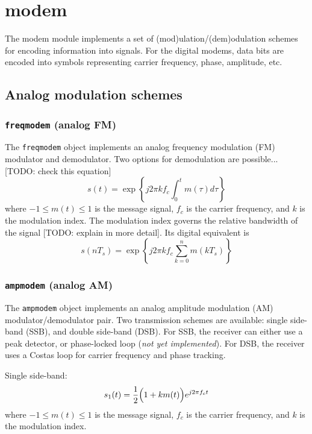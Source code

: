 % 
%

\section{modem}
\label{module:modem}
The modem module implements a set of (mod)ulation/(dem)odulation schemes
for encoding information into signals.
For the digital modems, data bits are encoded into symbols representing
carrier frequency, phase, amplitude, etc.

\subsection{Analog modulation schemes}
\subsubsection{{\tt freqmodem} (analog FM)}
The {\tt freqmodem} object implements an analog frequency modulation (FM)
modulator and demodulator.
Two options for demodulation are possible...
[TODO: check this equation]
\[
    s(t) =  \exp\left\{
                j 2 \pi k f_c
                \int_{0}^{t}{
                    m(\tau)d\tau
                }
            \right\}
\]
where $-1 \le m(t) \le 1$ is the message signal, $f_c$ is the carrier
frequency, and $k$ is the modulation index.
The modulation index governs the relative bandwidth of the signal
[TODO: explain in more detail].
Its digital equivalent is
\[
    s(nT_s) =   \exp\left\{
                    j 2 \pi k f_c
                    \sum_{k=0}^{n}{
                        m(kT_s)
                    }
                \right\}
\]

\subsubsection{{\tt ampmodem} (analog AM)}
The {\tt ampmodem} object implements an analog amplitude modulation (AM)
modulator/demodulator pair.
Two transmission schemes are available: single side-band (SSB), and
double side-band (DSB).
For SSB, the receiver can either use a peak detector, or phase-locked loop
({\it not yet implemented}).
For DSB, the receiver uses a Costas loop for carrier frequency and phase
tracking.

Single side-band:
\[
    s_1(t) = \frac{1}{2}\Bigl(1+k m(t)\Bigr)e^{j 2 \pi f_c t}
\]
where $-1 \le m(t) \le 1$ is the message signal, $f_c$ is the carrier frequency,
and $k$ is the modulation index.

